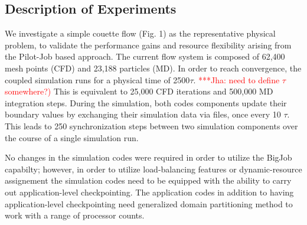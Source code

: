 \documentclass[conference,final]{IEEEtran}
\newcommand{\jhanote}[1]{ {\textcolor{red} { ***Jha: #1 }}}
\newcommand{\jhanote}[1]{}
\begin{document}

\subsection{Description of Experiments}

We investigate a simple couette flow (Fig. 1) as the representative
physical problem, to validate the performance gains and 
resource flexibility arising from the Pilot-Job based approach.
The current flow system is
composed of 62,400 mesh points (CFD) and 23,188 particles (MD).
In order to reach convergence, the coupled simulation runs for a
physical time of 2500$\tau$.  \jhanote{need to define $\tau$
  somewhere?)}  This is equivalent to 25,000 CFD iterations and
500,000 MD integration steps. During the simulation, both codes
components update their boundary values by exchanging their simulation
data via files, once every 10 $\tau$. This leads to 250
synchronization steps between two simulation components over
the course of a single simulation run.

No changes in the simulation codes were required in order
to utilize the BigJob capabilty; however, in order
to utilize load-balancing features or dynamic-resource
assignement the simulation codes need to be equipped
with the ability to carry out application-level checkpointing.
The application codes in addition to having application-level
checkpointing need generalized domain partitioning method to work
with a range of processor counts.
\end{document}
